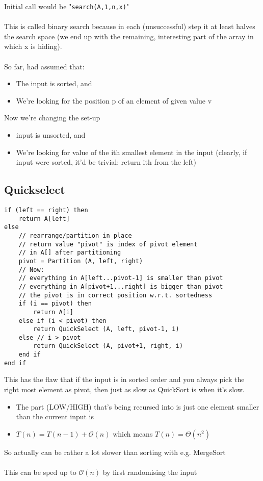 \documentclass{article}[18pt]
\begin{document}
Initial call would be "\texttt{search(A,1,n,x)}"\\
\\
This is called binary search because in each (unsuccessful) step it at least halves the search space (we end up with the remaining, interesting part of the array in which x is hiding).\\
\\
So far, had assumed that:
\begin{itemize}
	\item The input is sorted, and
	\item We're looking for the position p of an element of given value v 
\end{itemize}
Now we're changing the set-up
\begin{itemize}
	\item input is unsorted, and
	\item We're looking for value of the ith smallest element in the input (clearly, if input were sorted, it'd be trivial: return ith from the left)
\end{itemize}
\subsection{Quickselect}
\begin{lstlisting}
if (left == right) then
	return A[left]
else
	// rearrange/partition in place
	// return value "pivot" is index of pivot element
	// in A[] after partitioning
	pivot = Partition (A, left, right)
	// Now:
	// everything in A[left...pivot-1] is smaller than pivot
	// everything in A[pivot+1...right] is bigger than pivot
	// the pivot is in correct position w.r.t. sortedness
	if (i == pivot) then
		return A[i]
	else if (i < pivot) then
		return QuickSelect (A, left, pivot-1, i)
	else // i > pivot
		return QuickSelect (A, pivot+1, right, i)
	end if
end if
\end{lstlisting}
This has the flaw that if the input is in sorted order and you always pick the right most element as pivot, then just as slow as QuickSort is when it's slow.
\begin{itemize}
	\item The part (LOW/HIGH) that's being recursed into is just one element smaller than the current input is
	\item $T(n)=T(n-1)+\mathcal{O}(n)$ which means $T(n)=\Theta(n^2)$
\end{itemize}
So actually can be rather a lot slower than sorting with e.g. MergeSort\\
\\
This can be sped up to $\mathcal{O}(n)$ by first randomising the input
\end{document}

